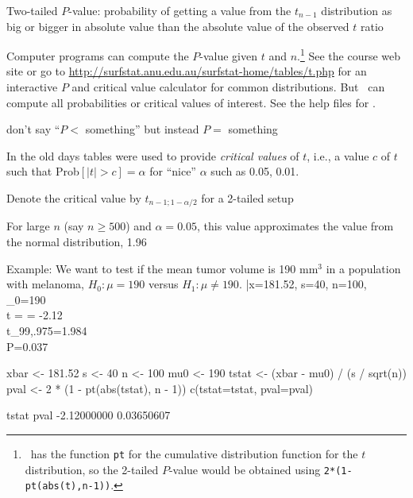 \item Two-tailed $P$-value: probability of getting a value from the
  $t_{n-1}$ distribution as big or bigger in absolute value than the
  absolute value of the observed $t$ ratio
\item Computer programs can compute the $P$-value given $t$ and
  $n$.\footnote{\R\ has the function \texttt{pt} for the cumulative
    distribution function for the $t$ distribution, so the 2-tailed
    $P$-value would be obtained using 
    \texttt{2*(1-pt(abs(t),n-1))}.}  See the course web site or go
  to \url{http://surfstat.anu.edu.au/surfstat-home/tables/t.php} for
  an interactive $P$ and critical value calculator for common
  distributions.  But \R\ can compute all probabilities or critical
  values of interest.  See the help files for .
 \bi
 \item don't say ``$P <$ something'' but instead $P=$ something
 \ei
\item In the old days tables were used to provide \emph{critical
    values} of $t$, i.e., a value $c$ of $t$ such that Prob$[|t| > c]
  = \alpha$ for ``nice'' $\alpha$ such as 0.05, 0.01.
\item Denote the critical value by $t_{n-1;1-\alpha/2}$ for a 2-tailed setup
\item For large $n$ (say $n \geq 500$) and $\alpha=0.05$, this value approximates
  the value from the normal distribution, 1.96
\item Example:  We want to test if the mean tumor volume is 190 mm$^3$ in a population with melanoma, $H_0: \mu = 190$ versus $H_1: \mu \neq 190$.
\beqa
\bar{x}=181.52, s=40, n=100, \mu_{0}=190 \\
t =  = -2.12 \\
t_{99,.975}=1.984 \rightarrow {} \\
P=0.037
\eeqa
\ei
\begin{Schunk}
\begin{Sinput}
xbar  <- 181.52
s     <- 40
n     <- 100
mu0   <- 190
tstat <- (xbar - mu0) / (s / sqrt(n))
pval  <- 2 * (1 - pt(abs(tstat), n - 1))
c(tstat=tstat, pval=pval)
\end{Sinput}
\begin{Soutput}
      tstat        pval 
-2.12000000  0.03650607 
\end{Soutput}
\end{Schunk}

